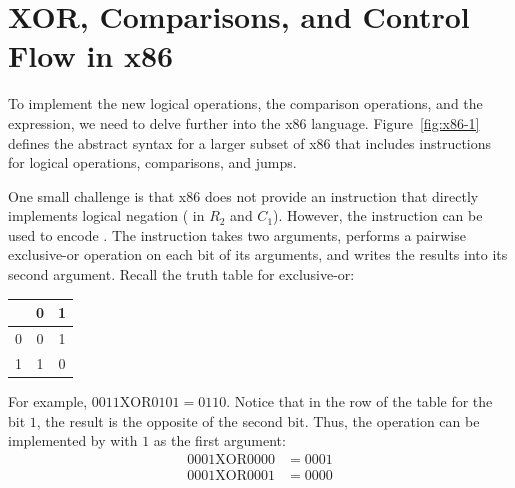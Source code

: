 \documentclass[11pt]{book}
\begin{document}
\section{XOR, Comparisons, and Control Flow in x86}
\label{sec:x86-1}

To implement the new logical operations, the comparison operations,
and the  expression, we need to delve further into the x86
language. Figure~\ref{fig:x86-1} defines the abstract syntax for a
larger subset of x86 that includes instructions for logical
operations, comparisons, and jumps.

One small challenge is that x86 does not provide an instruction that
directly implements logical negation ( in $R_2$ and $C_1$).
However, the  instruction can be used to encode .
The  instruction takes two arguments, performs a pairwise
exclusive-or operation on each bit of its arguments, and writes the
results into its second argument.  Recall the truth table for
exclusive-or:
\begin{center}
\begin{tabular}{l|cc}
   & 0 & 1 \\ \hline
0  & 0 & 1 \\
1  & 1 & 0
\end{tabular}
\end{center}
For example, $0011 \mathrel{\mathrm{XOR}} 0101 = 0110$.  Notice that
in the row of the table for the bit $1$, the result is the opposite of the
second bit.  Thus, the  operation can be implemented by
 with $1$ as the first argument:
\begin{align*}
  0001 \mathrel{\mathrm{XOR}} 0000 &= 0001\\
  0001 \mathrel{\mathrm{XOR}} 0001 &= 0000
\end{align*}
\end{document}
